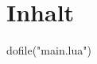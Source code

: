 \documentclass[paper=a4,ngerman]{scrartcl}
\begin{document}
\section{Inhalt}
\begin{luacode*}
dofile("main.lua")
\end{luacode*}
\end{document}
